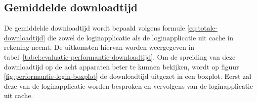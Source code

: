 
\subsection{Gemiddelde downloadtijd}
\label{sec:evaluatie-downloadtijd}
De gemiddelde downloadtijd wordt bepaald volgens formule \ref{eq:totale-downloadtijd} die zowel de loginapplicatie als de loginapplicatie uit cache in rekening neemt.
De uitkomsten hiervan worden weergegeven in tabel~\ref{tabel:evaluatie-performantie-downloadtijd}.
Om de spreiding van deze downloadtijd op de acht apparaten beter te kunnen bekijken, wordt op figuur \ref{fig:performantie-login-boxplot} de downloadtijd uitgezet in een boxplot.
Eerst zal deze van de loginapplicatie worden besproken en vervolgens van de loginapplicatie uit cache.

\begin{table}
\centering
{}
\caption{Gemiddelde downloadtijd van de loginapplicatie.}
\label{tabel:evaluatie-performantie-downloadtijd}
\end{table}

